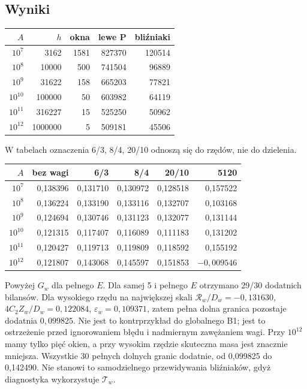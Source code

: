 \documentclass[11pt,a4paper]{article}
\newcommand{\R}{\mathcal R}
\newcommand{\T}{\mathcal T}
\begin{document}
\subsection{Wyniki}
\begin{center}\begin{tabular}{rrrrr}\toprule
$A$&$h$&okna&lewe P&bliźniaki\\\midrule
$10^7$&3162&1581&827370&120514\\
$10^8$&10000&500&741504&96889\\
$10^9$&31622&158&665203&77821\\
$10^{10}$&100000&50&603982&64119\\
$10^{11}$&316227&15&525250&50962\\
$10^{12}$&1000000&5&509181&45506\\\bottomrule\end{tabular}\end{center}
W tabelach oznaczenia 6/3, 8/4, 20/10 odnoszą się do rzędów, nie do dzielenia.
\begin{center}\small\begin{tabular}{rrrrrr}\toprule
$A$&bez wagi&6/3&8/4&20/10&5120\\\midrule
$10^7$&0,138396&0,131710&0,130972&0,128518&0,157522\\
$10^8$&0,136224&0,133190&0,133116&0,132707&0,103168\\
$10^9$&0,124694&0,130746&0,131123&0,132077&0,131144\\
$10^{10}$&0,121315&0,117407&0,116089&0,111183&0,131202\\
$10^{11}$&0,120427&0,119713&0,119809&0,118592&0,155192\\
$10^{12}$&0,121807&0,143068&0,145597&0,151853&$-0,009546$\\\bottomrule\end{tabular}\end{center}
Powyżej $G_w$ dla pełnego $E$. Dla samej 5 i pełnego $E$ otrzymano 29/30 dodatnich bilansów. Dla wysokiego rzędu na największej skali $\R_w/D_w=-0{,}131630$, $4C_2 Z_w/D_w=0{,}122084$, $\varepsilon_w=0{,}109371$, zatem pełna dolna granica pozostaje dodatnia $0{,}099825$. Nie jest to kontrprzykład do globalnego B1; jest to ostrzeżenie przed ignorowaniem błędu i nadmiernym zawężaniem wagi. Przy $10^{12}$ mamy tylko pięć okien, a przy wysokim rzędzie skuteczna masa jest znacznie mniejsza. Wszystkie 30 pełnych dolnych granic dodatnie, od 0,099825 do 0,142490. Nie stanowi to samodzielnego przewidywania bliźniaków, gdyż diagnostyka wykorzystuje $\T_w$.
\end{document}
